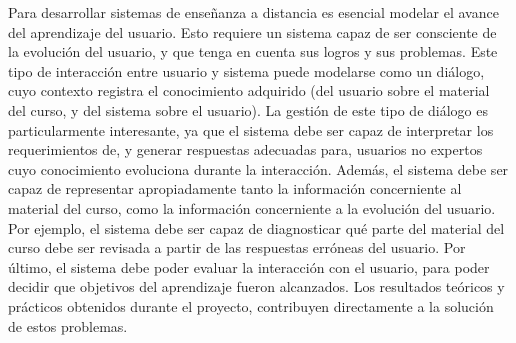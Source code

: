 \documentclass[11pt]{article}
\begin{document}
Para desarrollar sistemas de ense\~nanza a distancia es esencial modelar el
avance del aprendizaje del usuario. Esto requiere un sistema capaz de ser
consciente de la evoluci\'on del usuario, y que tenga en cuenta sus logros y sus
problemas. Este tipo de interacci\'on entre usuario y sistema puede modelarse
como un di\'alogo, cuyo contexto registra el conocimiento adquirido (del usuario
sobre el material del curso, y del sistema sobre el usuario). La gesti\'on de
este tipo de di\'alogo es particularmente interesante, ya que el sistema debe
ser
capaz de interpretar los requerimientos de, y generar respuestas adecuadas para,
usuarios no expertos cuyo conocimiento evoluciona durante la interacci\'on.
Adem\'as, el sistema debe ser capaz de representar apropiadamente tanto la
informaci\'on concerniente al material del curso, como la informaci\'on
concerniente a la evoluci\'on del usuario. Por ejemplo, el sistema debe ser
capaz de diagnosticar qu\'e parte del material del curso debe ser revisada a
partir de las respuestas err\'oneas del usuario.  Por \'ultimo, el sistema debe
poder evaluar la interacci\'on con el usuario, para poder decidir
que objetivos del aprendizaje fueron alcanzados.
Los resultados te\'oricos y pr\'acticos obtenidos durante el proyecto,
contribuyen directamente a la soluci\'on de estos problemas.

% 
% 

  
\end{document}
